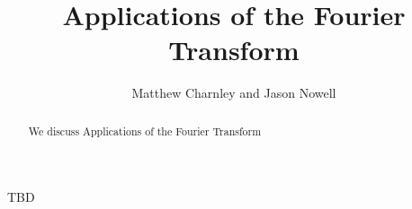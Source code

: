 \documentclass{ximera}
\title{Applications of the Fourier Transform}
\author{Matthew Charnley and Jason Nowell}
\begin{document}
\begin{abstract}
    We discuss Applications of the Fourier Transform
\end{abstract}
\maketitle


TBD

\section{}
\label{appFourierTransform:section}
\end{document}
